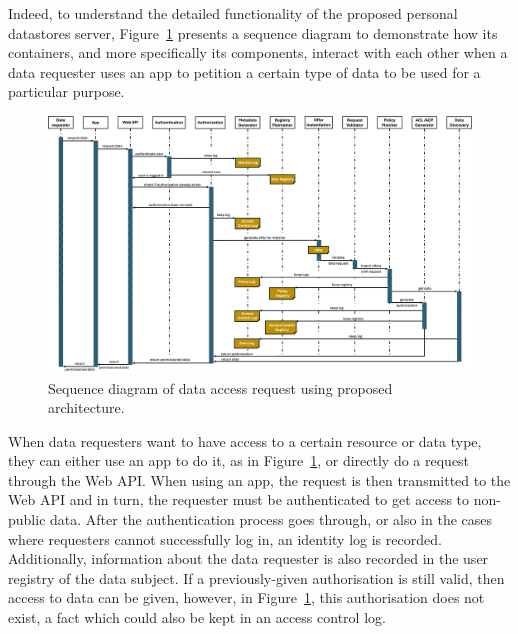 Indeed, to understand the detailed functionality of the proposed personal datastores server, Figure~\ref{fig:c4-sequence} presents a sequence diagram to demonstrate how its containers, and more specifically its components, interact with each other when a data requester uses an app to petition a certain type of data to be used for a particular purpose.

\begin{landscape}
\begin{figure}[htp]
    \centering
    \includegraphics[width=1\linewidth]{figures//chapter-6/sequence.png}
    \caption{Sequence diagram of data access request using proposed architecture.}
    \label{fig:c4-sequence}
\end{figure}
\end{landscape}

When data requesters want to have access to a certain resource or data type, they can either use an app to do it, as in Figure~\ref{fig:c4-sequence}, or directly do a request through the Web API.
When using an app, the request is then transmitted to the Web API and in turn, the requester must be authenticated to get access to non-public data.
After the authentication process goes through, or also in the cases where requesters cannot successfully log in, an identity log is recorded.
Additionally, information about the data requester is also recorded in the user registry of the data subject.
If a previously-given authorisation is still valid, then access to data can be given, however, in Figure~\ref{fig:c4-sequence}, this authorisation does not exist, a fact which could also be kept in an access control log.

